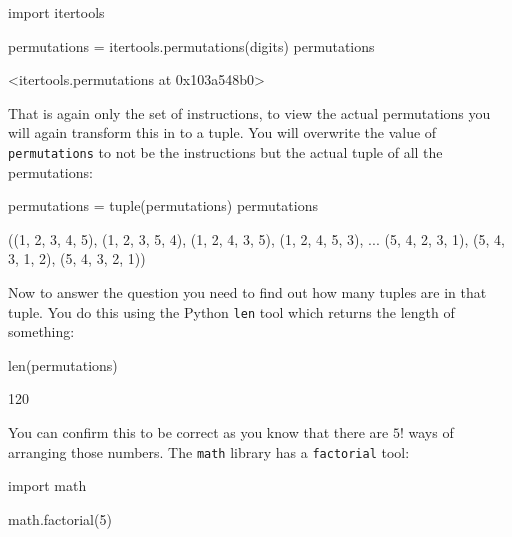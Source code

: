 \begin{pyin}
import itertools

permutations = itertools.permutations(digits)
permutations
\end{pyin}





\begin{raw}
<itertools.permutations at 0x103a548b0>
\end{raw}

That is again only the set of instructions, to view the actual permutations you
will again transform this in to a tuple. You will overwrite the value
of \texttt{permutations} to not be the instructions but the actual tuple of all the
permutations:

\begin{pyin}
permutations = tuple(permutations)
permutations
\end{pyin}





\begin{raw}
((1, 2, 3, 4, 5),
 (1, 2, 3, 5, 4),
 (1, 2, 4, 3, 5),
 (1, 2, 4, 5, 3),
 ...
 (5, 4, 2, 3, 1),
 (5, 4, 3, 1, 2),
 (5, 4, 3, 2, 1))
\end{raw}






Now to answer the question you need to find out how many tuples are in that
tuple. You do this using the Python \texttt{len} tool which returns the length of
something:




\begin{pyin}
len(permutations)
\end{pyin}





\begin{raw}
120
\end{raw}





You can confirm this to be correct as you know that there are \(5!\) ways of
arranging those numbers. The \texttt{math} library has a \texttt{factorial} tool:




\begin{pyin}
import math

math.factorial(5)
\end{pyin}






